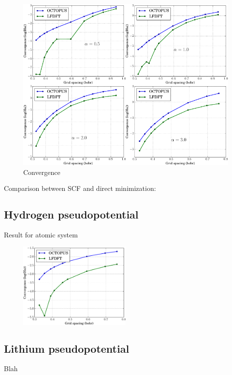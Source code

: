 \begin{figure}[h]
\centering
\includegraphics[scale=1.0]{images/COMBINE_v1.pdf}
\caption{Convergence}
\end{figure}

Comparison between SCF and direct minimization:

\subsection{Hydrogen pseudopotential}

Result for atomic system

\begin{figure}[h]
\includegraphics[width=0.5\textwidth]{images/CONV_atom_H.pdf}
\end{figure}

\subsection{Lithium pseudopotential}
Blah

